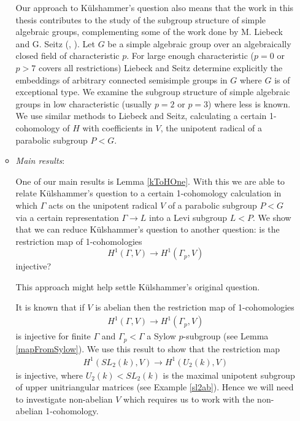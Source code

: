 \begin{itemize}
\begin{itemize}
		
		Our approach to K\"ulshammer's question also means that the work in this thesis contributes to the study of the subgroup structure of simple algebraic groups, complementing some of the work done by M. Liebeck and G. Seitz (\cite{liebeck1996reductive}, \cite{liebeck2004maximal}). Let $G$ be a simple algebraic group over an algebraically closed field of characteristic $p$. For large enough characteristic ($p=0$ or $p>7$ covers all restrictions) Liebeck and Seitz determine explicitly the embeddings of arbitrary connected semisimple groups in $G$ where $G$ is of exceptional type. We examine the subgroup structure of simple algebraic groups in low characteristic (usually $p=2$ or $p=3$) where less is known. We use similar methods to Liebeck and Seitz, calculating a certain 1-cohomology of $H$ with coefficients in $V$, the unipotent radical of a parabolic subgroup $P < G$.
		
		

		\item \emph{Main results}:
		
		
		One of our main results is Lemma \ref{kToHOne}. With this we are able to relate K\"ulshammer's question to a certain 1-cohomology calculation in which $\Gamma$ acts on the unipotent radical $V$ of a parabolic subgroup $P < G$ via a certain representation $\Gamma \rightarrow L$ into a Levi subgroup $L < P$. We show that we can reduce K\"ulshammer's question to another question: is the restriction map of 1-cohomologies
		\begin{displaymath}
			H^1(\Gamma, V) \rightarrow H^1(\Gamma_p, V)
		\end{displaymath}
		injective?
		
		
		This approach might help settle K\"ulshammer's original question.
		
		
		It is known that if $V$ is abelian then the restriction map of 1-cohomologies
		\begin{eqnarray*}
			H^1(\Gamma, V)\rightarrow H^1(\Gamma_p, V)
		\end{eqnarray*}
		is injective for finite $\Gamma$ and $\Gamma_p < \Gamma$ a Sylow $p$-subgroup (see Lemma \ref{mapFromSylow}). We use this result to show that the restriction map
		\begin{eqnarray*}
			H^1(SL_2(k), V) \rightarrow H^1(U_2(k), V)
		\end{eqnarray*}
		is injective, where $U_2(k) < SL_2(k)$ is the maximal unipotent subgroup of upper unitriangular matrices (see Example \ref{sl2ab}). Hence we will need to investigate non-abelian $V$ which requires us to work with the non-abelian 1-cohomology.



\end{itemize}
\end{itemize}
